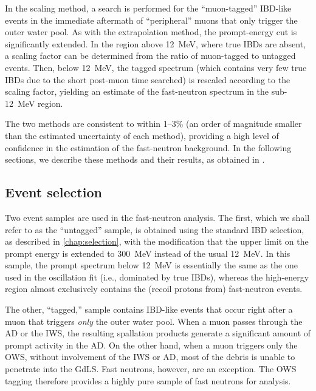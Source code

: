 \documentclass[../thesis.tex]{subfiles}
\begin{document}
In the scaling method, a search is performed for the ``muon-tagged'' IBD-like events in the immediate aftermath of ``peripheral'' muons that only trigger the outer water pool. As with the extrapolation method, the prompt-energy cut is significantly extended. In the region above 12~MeV, where true IBDs are absent, a scaling factor can be determined from the ratio of muon-tagged to untagged events. Then, below 12~MeV, the tagged spectrum (which contains very few true IBDs due to the short post-muon time searched) is rescaled according to the scaling factor, yielding an estimate of the fast-neutron spectrum in the sub-12~MeV region.

The two methods are consistent to within 1--3\% (an order of magnitude smaller than the estimated uncertainty of each method), providing a high level of confidence in the estimation of the fast-neutron background. In the following sections, we describe these methods and their results, as obtained in \cite{fastn}.

\subsection{Event selection}
\label{sec:fastn_sel}

Two event samples are used in the fast-neutron analysis. The first, which we shall refer to as the ``untagged'' sample, is obtained using the standard IBD selection, as described in \autoref{chap:selection}, with the modification that the upper limit on the prompt energy is extended to 300~MeV instead of the usual 12~MeV. In this sample, the prompt spectrum below 12~MeV is essentially the same as the one used in the oscillation fit (i.e., dominated by true IBDs), whereas the high-energy region almost exclusively contains the (recoil protons from) fast-neutron events.

The other, ``tagged,'' sample contains IBD-like events that occur right after a muon that triggers \emph{only} the outer water pool. When a muon passes through the AD or the IWS, the resulting spallation products generate a significant amount of prompt activity in the AD. On the other hand, when a muon triggers only the OWS, without involvement of the IWS or AD, most of the debris is unable to penetrate into the GdLS. Fast neutrons, however, are an exception. The OWS tagging therefore provides a highly pure sample of fast neutrons for analysis.
\end{document}
